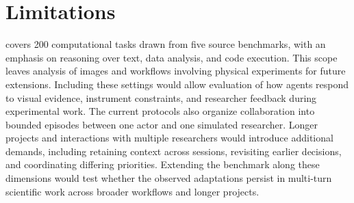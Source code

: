 \section{Limitations}
\label{sec:limitations}

\benchmark covers 200 computational tasks drawn from five source benchmarks,
with an emphasis on reasoning over text, data analysis, and code execution.
This scope leaves analysis of images and workflows involving physical
experiments for future extensions. Including these settings would allow
evaluation of how agents respond to visual evidence, instrument constraints,
and researcher feedback during experimental work. The current protocols also
organize collaboration into bounded episodes between one actor and one
simulated researcher. Longer projects and interactions with multiple
researchers would introduce additional demands, including retaining context
across sessions, revisiting earlier decisions, and coordinating differing
priorities. Extending the benchmark along these dimensions would test whether
the observed adaptations persist in multi-turn scientific work across
broader workflows and longer projects.
